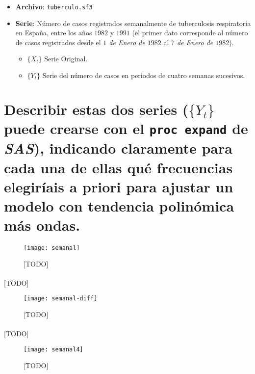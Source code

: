 \documentclass[a4paper, spanish]{article}
\begin{document}
  \maketitle

  \begin{itemize}
    \item \textbf{Archivo}: \texttt{tuberculo.sf3}
    \item \textbf{Serie}: Número de casos registrados semanalmente de tuberculosis respiratoria en España, entre los años $1982$ y $1991$ (el primer dato corresponde al número de casos registrados desde el \emph{$1$ de Enero de $1982$} al \emph{$7$ de Enero de $1982$}).
    \begin{itemize}
      \item $\{X_t\}$ Serie Original.
      \item $\{Y_t\}$ Serie del número de casos en periodos de cuatro semanas sucesivos.
    \end{itemize}
  \end{itemize}

  \section{Describir estas dos series ($\{Y_t\}$ puede crearse con el \texttt{proc expand} de \emph{SAS}), indicando claramente para cada una de ellas qué frecuencias elegiríais a priori para ajustar un modelo con tendencia polinómica más ondas.}
  \label{sec:a}


    \begin{figure}
      \centering
      \texttt{[image: semanal]}
      \caption{[TODO]}
      \label{fig:fitted}
    \end{figure}

    \paragraph{}
    [TODO]


    \begin{figure}
      \centering
      \texttt{[image: semanal-diff]}
      \caption{[TODO]}
      \label{fig:fitted}
    \end{figure}

    \paragraph{}
    [TODO]


    \begin{figure}
      \centering
      \texttt{[image: semanal4]}
      \caption{[TODO]}
      \label{fig:fitted}
    \end{figure}
\end{document}
